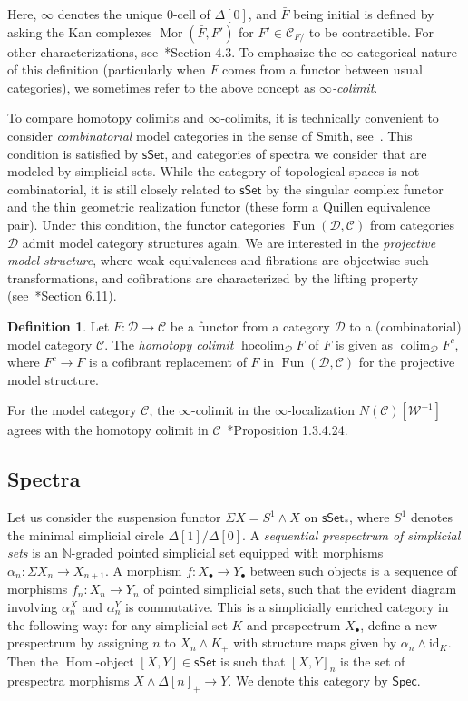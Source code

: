 \documentclass[a4paper,reqno]{amsart}
\theoremstyle{plain}
\theoremstyle{definition}
\newtheorem{definition}[theorem]{Definition}
\theoremstyle{remark}
\numberwithin{equation}{section}
\newcommand{\cC}{\mathcal{C}}
\newcommand{\cD}{\mathcal{D}}
\newcommand{\cW}{\mathcal{W}}
\newcommand{\dN}{\mathbb{N}}
\newcommand{\sSet}{\mathsf{sSet}}
\newcommand{\Spec}{\mathsf{Spec}}
\newcommand{\id}{\mathrm{id}}
\DeclareMathOperator*{\hocolim}{hocolim}
\DeclareMathOperator{\Fun}{Fun}
\DeclareMathOperator{\Mor}{Mor}
\DeclareMathOperator{\Hom}{Hom}
\DeclareMathOperator*{\colim}{colim}
\begin{document}
Here, $\infty$ denotes the unique $0$-cell of $\Delta[0]$, and $\bar{F}$ being initial is defined by asking the Kan complexes $\Mor(\bar{F}, F')$ for $F' \in \cC_{F/}$ to be contractible.
For other characterizations, see~\cite{land:inftybook}*{Section 4.3}.
To emphasize the $\infty$-categorical nature of this definition (particularly when $F$ comes from a functor between usual categories), we sometimes refer to the above concept as \emph{$\infty$-colimit}.

To compare homotopy colimits and $\infty$-colimits, it is technically convenient to consider \emph{combinatorial} model categories in the sense of Smith, see~\cite{dug:thm}.
This condition is satisfied by $\sSet$, and categories of spectra we consider that are modeled by simplicial sets. While the category of topological spaces is not combinatorial, it is still closely related to $\sSet$ by the singular complex functor and the thin geometric realization functor (these form a Quillen equivalence pair). Under this condition, the functor categories $\Fun(\cD, \cC)$ from categories $\cD$ admit model category structures again. We are interested in the \emph{projective model structure}, where weak equivalences and fibrations are objectwise such transformations, and cofibrations are characterized by the lifting property (see~\cite{hirsch:model}*{Section 6.11}).

\begin{definition}
Let $F \colon \cD \to \cC$ be a functor from a category $\cD$ to a (combinatorial) model category $\cC$.
The \emph{homotopy colimit} $\hocolim_\cD F$ of $F$ is given as $\colim_\cD F^c$, where $F^c \to F$ is a cofibrant replacement of $F$ in $\Fun(\cD, \cC)$ for the projective model structure.
\end{definition}

For the model category $\cC$, the $\infty$-colimit in the $\infty$-localization $N(\cC)[\cW^{-1}]$ agrees with the homotopy colimit in $\cC$~\cite{lur:ha}*{Proposition 1.3.4.24}.

\subsection{Spectra}

Let us consider the suspension functor $\Sigma X = S^1 \wedge X$ on $\sSet_*$, where $S^1$ denotes the minimal simplicial circle $\Delta[1] / \Delta[0]$.
A \emph{sequential prespectrum of simplicial sets} is an $\dN$-graded pointed simplicial set equipped with morphisms $\alpha_n\colon \Sigma X_n\to X_{n+1}$.
A morphism $f\colon X_\bullet \to Y_\bullet$ between such objects is a sequence of morphisms $f_n\colon X_n\to Y_n$ of pointed simplicial sets, such that the evident diagram involving $\alpha^X_n$ and $\alpha^Y_n$ is commutative.
This is a simplicially enriched category in the following way: for any simplicial set $K$ and prespectrum $X_\bullet$, define a new prespectrum by assigning $n$ to $X_n\wedge K_+$ with structure maps given by $\alpha_n\wedge \id_K$.
Then the $\Hom$-object $[X,Y]\in \sSet$ is such that $[X,Y]_n$ is the set of prespectra morphisms $X\wedge \Delta[n]_+ \to Y$.
We denote this category by $\Spec$.
\end{document}
